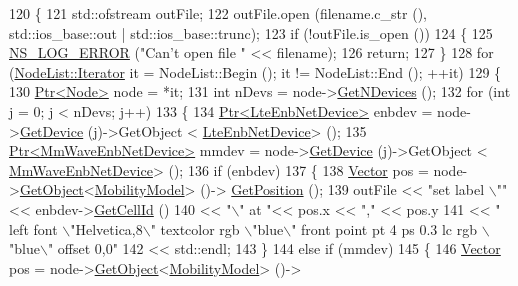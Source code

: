 \begin{DoxyCode}
120 \{
121   std::ofstream outFile;
122   outFile.open (filename.c\_str (), std::ios\_base::out | std::ios\_base::trunc);
123   \textcolor{keywordflow}{if} (!outFile.is\_open ())
124     \{
125       \hyperlink{group__logging_ga0261a8db1d4ac5f79417d117634fd455}{NS\_LOG\_ERROR} (\textcolor{stringliteral}{"Can't open file "} << filename);
126       \textcolor{keywordflow}{return};
127     \}
128   \textcolor{keywordflow}{for} (\hyperlink{classns3_1_1NodeList_a9e2679a94efb4f0066cc21e65440364d}{NodeList::Iterator} it = NodeList::Begin (); it != NodeList::End (); ++it)
129     \{
130       \hyperlink{classns3_1_1Ptr}{Ptr<Node>} node = *it;
131       \textcolor{keywordtype}{int} nDevs = node->\hyperlink{classns3_1_1Node_a531554d2241ba4fa1cd74e3360be6bce}{GetNDevices} ();
132       \textcolor{keywordflow}{for} (\textcolor{keywordtype}{int} j = 0; j < nDevs; j++)
133         \{
134           \hyperlink{classns3_1_1Ptr}{Ptr<LteEnbNetDevice>} enbdev = node->\hyperlink{classns3_1_1Node_a5918dfd24ef632efc9a83a5f6561c76e}{GetDevice} (j)->GetObject <
      \hyperlink{classns3_1_1LteEnbNetDevice}{LteEnbNetDevice}> ();
135           \hyperlink{classns3_1_1Ptr}{Ptr<MmWaveEnbNetDevice>} mmdev = node->\hyperlink{classns3_1_1Node_a5918dfd24ef632efc9a83a5f6561c76e}{GetDevice} (j)->GetObject <
      \hyperlink{classns3_1_1MmWaveEnbNetDevice}{MmWaveEnbNetDevice}> ();
136           \textcolor{keywordflow}{if} (enbdev)
137             \{
138               \hyperlink{classns3_1_1Vector3D_a7e59b47bc94c9cb1dadff68c1d0112d8}{Vector} pos = node->\hyperlink{classns3_1_1Object_a13e18c00017096c8381eb651d5bd0783}{GetObject}<\hyperlink{classns3_1_1MobilityModel}{MobilityModel}> ()->
      \hyperlink{lena-cqi-threshold_8cc_acebf763e1a0478cec225f9547941ae54}{GetPosition} ();
139               outFile << \textcolor{stringliteral}{"set label \(\backslash\)""} << enbdev->\hyperlink{classns3_1_1LteEnbNetDevice_a6945c929a037e7a582e9e4a849dec337}{GetCellId} ()
140                       << \textcolor{stringliteral}{"\(\backslash\)" at "}<< pos.x << \textcolor{stringliteral}{","} << pos.y
141                       << \textcolor{stringliteral}{" left font \(\backslash\)"Helvetica,8\(\backslash\)" textcolor rgb \(\backslash\)"blue\(\backslash\)" front  point pt 4 ps 0.3 lc rgb
       \(\backslash\)"blue\(\backslash\)" offset 0,0"}
142                       << std::endl;
143             \}
144           \textcolor{keywordflow}{else} \textcolor{keywordflow}{if} (mmdev)
145             \{
146               \hyperlink{classns3_1_1Vector3D_a7e59b47bc94c9cb1dadff68c1d0112d8}{Vector} pos = node->\hyperlink{classns3_1_1Object_a13e18c00017096c8381eb651d5bd0783}{GetObject}<\hyperlink{classns3_1_1MobilityModel}{MobilityModel}> ()->

\end{DoxyCode}
